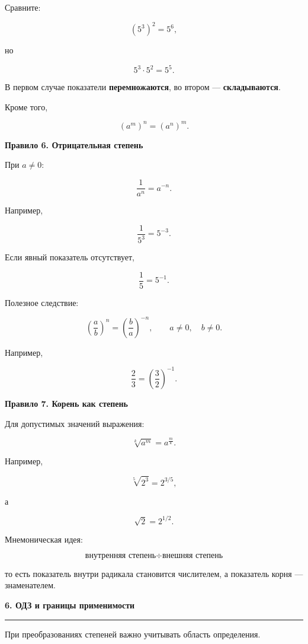 \documentclass[a4paper,12pt]{article}
\newcommand{\MainSection}[1]{%
  \vspace{0.7em}
  {\Large\bfseries\color{darkaccent}#1\par}
  \vspace{0.25em}
  {\color{accent}\rule{\linewidth}{0.6pt}}
  \vspace{0.5em}
}
\newcommand{\SubSection}[1]{%
  \vspace{0.5em}
  {\large\bfseries\color{accent}#1\par}
  \vspace{0.2em}
}
\newcommand{\important}[1]{\textbf{\color{darkaccent}#1}}
\begin{document}
Сравните:

\[
(5^3)^2=5^6,
\]

но

\[
5^3\cdot5^2=5^5.
\]

В первом случае показатели \important{перемножаются},
во втором --- \important{складываются}.

Кроме того,

\[
(a^m)^n=(a^n)^m.
\]


\SubSection{Правило 6. Отрицательная степень}

При \(a\ne0\):

\[
\frac1{a^n}=a^{-n}.
\]

Например,

\[
\frac1{5^3}=5^{-3}.
\]

Если явный показатель отсутствует,

\[
\frac15=5^{-1}.
\]

Полезное следствие:

\[
\left(\frac ab\right)^n
=
\left(\frac ba\right)^{-n},
\qquad
a\ne0,\quad b\ne0.
\]

Например,

\[
\frac23
=
\left(\frac32\right)^{-1}.
\]


\SubSection{Правило 7. Корень как степень}

Для допустимых значений выражения:

\[
\sqrt[k]{a^m}
=
a^{\frac{m}{k}}.
\]

Например,

\[
\sqrt[5]{2^3}=2^{3/5},
\]

а

\[
\sqrt2=2^{1/2}.
\]

Мнемоническая идея:

\[
\boxed{
\text{внутренняя степень}
\div
\text{внешняя степень}
}
\]

то есть показатель внутри радикала становится числителем,
а показатель корня --- знаменателем.


\MainSection{6. ОДЗ и границы применимости}

При преобразованиях степеней важно учитывать область определения.
\end{document}
